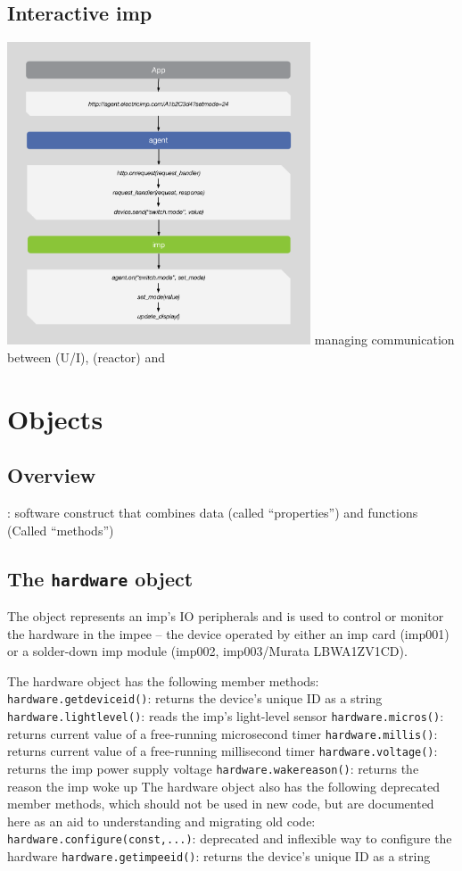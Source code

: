 \documentclass{myproc}
\begin{document}
\subsection{Interactive imp}
\includegraphics[width=9cm]{pics/interactive}
\bit
\w \textcolor{green2}{managing communication between  (U/I),
   (reactor) and }

\eit


\section{Objects}
\subsection{Overview}
\bit
\w {}: software construct that combines data (called ``properties'')
and functions (Called ``methods'')
\eit
\subsection{The {\tt{}hardware} object}
The  object represents an imp's IO peripherals and is used to
control or monitor the hardware in the impee – the device operated by either
an imp card (imp001) or a solder-down imp module (imp002, imp003/Murata
LBWA1ZV1CD). 

The hardware object has the following member methods:
\bit
\w \textcolor{blue2}{\tt{}hardware.getdeviceid()}: returns the
\textcolor{red2}{device's unique ID} as a string 
\w \textcolor{blue2}{\tt{}hardware.lightlevel()}: reads the imp's light-level
sensor 
\w \textcolor{blue2}{\tt{}hardware.micros()}: returns current value of a
free-running microsecond timer 
\w \textcolor{blue2}{\tt{}hardware.millis()}: returns current value of a
free-running millisecond timer 
\w \textcolor{blue2}{\tt{}hardware.voltage()}: returns the imp power supply
voltage 
\w \textcolor{blue2}{\tt{}hardware.wakereason()}: returns the reason the imp
woke up 
\eit
The hardware object also has the following deprecated member methods, which should not be used in new code, but are documented here as an aid to understanding and migrating old code:
\bit
\w \textcolor{blue2}{\tt{}hardware.configure(const,...)}: deprecated and inflexible way to configure the hardware
\w \textcolor{blue2}{\tt{}hardware.getimpeeid()}: returns the device's unique ID as a string
\eit


\end{document}

